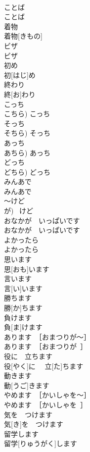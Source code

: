 \documentclass[8pt]{extreport}
\begin{document}
\begin{CJK}{UTF8}{min}
\\	ことば	
\\	ことば	
\\	着物	
\\	着物[きもの]	
\\	ビザ	
\\	ビザ	
\\	初め	
\\	初[はじ]め	
\\	終わり	
\\	終[お]わり	
\\	こっち	
\\	こちら)	こっち	
\\	そっち	
\\	そちら)	そっち	
\\	あっち	
\\	あちら)	あっち	
\\	どっち	
\\	どちら)	どっち	
\\	みんあで	
\\	みんあで	
\\	～けど	
\\	が)	~けど	
\\	おなかが　いっぱいです	
\\	おなかが　いっぱいです	
\\	よかったら	
\\	よかったら	
\\	思います	
\\	思[おも]います	
\\	言います	
\\	言[い]います	
\\	勝ちます	
\\	勝[か]ちます	
\\	負けます	
\\	負[ま]けます	
\\	あります　［おまつりが～］	
\\	あります　［おまつりが~］	
\\	役に　立ちます	
\\	役[やく]に　 立[た]ちます	
\\	動きます	
\\	動[うご]きます	
\\	やめます　［かいしゃを～］	
\\	やめます　［かいしゃを~］	
\\	気を　つけます	
\\	気[き]を　つけます	
\\	留学します	
\\	留学[りゅうがく]します	

\end{CJK}
\end{document}
